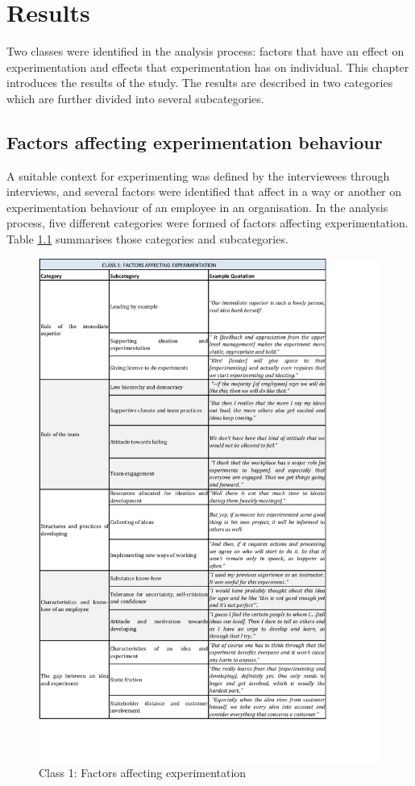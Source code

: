 \chapter{Results} \label{results}
Two classes were identified in the analysis process: factors that have an effect on experimentation and effects that experimentation has on individual. This chapter introduces the results of the study. The results are described in two categories which are further divided into several subcategories. 

\section{Factors affecting experimentation behaviour}
A suitable context for experimenting was defined by the interviewees through interviews, and several factors were identified that affect in a way or another on experimentation behaviour of an employee in an organisation. In the analysis process, five different categories were formed of factors affecting experimentation. Table \ref{tbl:class1} summarises those categories and subcategories. 

\begin{figure}[!H]
\vspace{-20pt}
\hspace{-25pt}
\includegraphics{class1.pdf}
\vspace{-80pt}
\caption{Class 1: Factors affecting experimentation}
\label{tbl:class1}
\end{figure}
%

